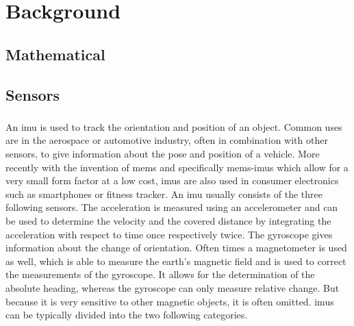 \chapter{Background}
\label{ch:Background}

\section{Mathematical}



\section{Sensors}
\subsection{}
An \acrfull{imu} is used to track the orientation and position of an object.
Common uses are in the aerospace or automotive industry, often in combination with other sensors, to give information about the pose and position of a vehicle.
More recently with the invention of \acrfull{mems} and specifically \acrshort{mems}-\acrshort{imu}s which allow for a very small form factor at a low cost, \acrshort{imu}s are also used in consumer electronics such as smartphones or fitness tracker.
An \acrshort{imu} usually consists of the three following sensors.
The acceleration is measured using an accelerometer and can be used to determine the velocity and the covered distance by integrating the acceleration with respect to time once respectively twice.
The gyroscope gives information about the change of orientation.
Often times a magnetometer is used as well, which is able to measure the earth's magnetic field and is used to correct the measurements of the gyroscope.
It allows for the determination of the absolute heading, whereas the gyroscope can only measure relative change. But because it is very sensitive to other magnetic objects, it is often omitted.
\acrshort{imu}s can be typically divided into the two following categories.


